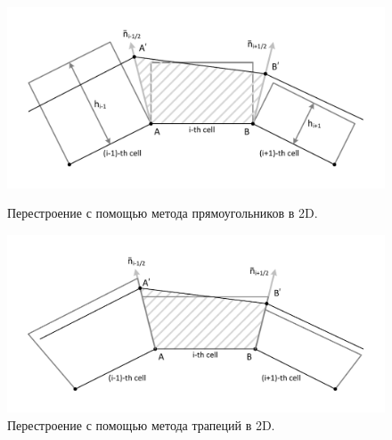 \begin{figure}
  \centering
  \begin{minipage}[b]{0.49\textwidth}
    \includegraphics[width=\textwidth]{pics/pic_classical_methods_rectangles_size.pdf}
    \caption{Перестроение с помощью метода прямоугольников в 2D.}\label{fig:pic_classical_methods_rectangles}
  \end{minipage}
  \hfill
  \begin{minipage}[b]{0.49\textwidth}
    \includegraphics[width=\textwidth]{pics/pic_classical_methods_trapezoids_size.pdf}
    \caption{Перестроение с помощью метода трапеций в 2D.}\label{fig:pic_classical_methods_trapezoids}
  \end{minipage}
\end{figure}
